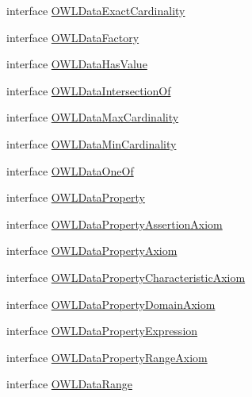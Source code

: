 \begin{DoxyCompactItemize}
\item 
interface \hyperlink{interfaceorg_1_1semanticweb_1_1owlapi_1_1model_1_1_o_w_l_data_exact_cardinality}{O\-W\-L\-Data\-Exact\-Cardinality}
\item 
interface \hyperlink{interfaceorg_1_1semanticweb_1_1owlapi_1_1model_1_1_o_w_l_data_factory}{O\-W\-L\-Data\-Factory}
\item 
interface \hyperlink{interfaceorg_1_1semanticweb_1_1owlapi_1_1model_1_1_o_w_l_data_has_value}{O\-W\-L\-Data\-Has\-Value}
\item 
interface \hyperlink{interfaceorg_1_1semanticweb_1_1owlapi_1_1model_1_1_o_w_l_data_intersection_of}{O\-W\-L\-Data\-Intersection\-Of}
\item 
interface \hyperlink{interfaceorg_1_1semanticweb_1_1owlapi_1_1model_1_1_o_w_l_data_max_cardinality}{O\-W\-L\-Data\-Max\-Cardinality}
\item 
interface \hyperlink{interfaceorg_1_1semanticweb_1_1owlapi_1_1model_1_1_o_w_l_data_min_cardinality}{O\-W\-L\-Data\-Min\-Cardinality}
\item 
interface \hyperlink{interfaceorg_1_1semanticweb_1_1owlapi_1_1model_1_1_o_w_l_data_one_of}{O\-W\-L\-Data\-One\-Of}
\item 
interface \hyperlink{interfaceorg_1_1semanticweb_1_1owlapi_1_1model_1_1_o_w_l_data_property}{O\-W\-L\-Data\-Property}
\item 
interface \hyperlink{interfaceorg_1_1semanticweb_1_1owlapi_1_1model_1_1_o_w_l_data_property_assertion_axiom}{O\-W\-L\-Data\-Property\-Assertion\-Axiom}
\item 
interface \hyperlink{interfaceorg_1_1semanticweb_1_1owlapi_1_1model_1_1_o_w_l_data_property_axiom}{O\-W\-L\-Data\-Property\-Axiom}
\item 
interface \hyperlink{interfaceorg_1_1semanticweb_1_1owlapi_1_1model_1_1_o_w_l_data_property_characteristic_axiom}{O\-W\-L\-Data\-Property\-Characteristic\-Axiom}
\item 
interface \hyperlink{interfaceorg_1_1semanticweb_1_1owlapi_1_1model_1_1_o_w_l_data_property_domain_axiom}{O\-W\-L\-Data\-Property\-Domain\-Axiom}
\item 
interface \hyperlink{interfaceorg_1_1semanticweb_1_1owlapi_1_1model_1_1_o_w_l_data_property_expression}{O\-W\-L\-Data\-Property\-Expression}
\item 
interface \hyperlink{interfaceorg_1_1semanticweb_1_1owlapi_1_1model_1_1_o_w_l_data_property_range_axiom}{O\-W\-L\-Data\-Property\-Range\-Axiom}
\item 
interface \hyperlink{interfaceorg_1_1semanticweb_1_1owlapi_1_1model_1_1_o_w_l_data_range}{O\-W\-L\-Data\-Range}

\end{DoxyCompactItemize}
